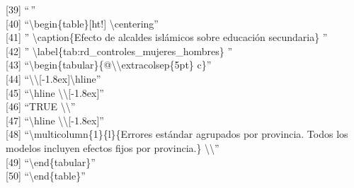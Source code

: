 \documentclass[
]{article}
\begin{document}
{[}39{]} ``\,''\\
{[}40{]} ``\textbackslash begin\{table\}{[}ht!{]}
\textbackslash centering''\\
{[}41{]} '' \textbackslash caption\{Efecto de alcaldes islámicos sobre
educación secundaria\} ''\\
{[}42{]} '' \textbackslash label\{tab:rd\_controles\_mujeres\_hombres\}
''\\
{[}43{]}
``\textbackslash begin\{tabular\}\{@\textbackslash\textbackslash extracolsep\{5pt\}
c\}''\\
{[}44{]}
``\textbackslash\textbackslash{[}-1.8ex{]}\textbackslash hline''\\
{[}45{]} ``\textbackslash hline
\textbackslash\textbackslash{[}-1.8ex{]}''\\
{[}46{]} ``TRUE \textbackslash\textbackslash{}''\\
{[}47{]} ``\textbackslash hline
\textbackslash\textbackslash{[}-1.8ex{]}''\\
{[}48{]} ``\textbackslash multicolumn\{1\}\{l\}\{Errores estándar
agrupados por provincia. Todos los modelos incluyen efectos fijos por
provincia.\} \textbackslash\textbackslash{}''\\
{[}49{]} ``\textbackslash end\{tabular\}''\\
{[}50{]} ``\textbackslash end\{table\}''
\end{document}

